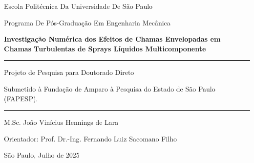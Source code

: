 \begin{titlepage}
    \centering
    \large
    {
    Escola Politécnica Da Universidade De São Paulo \par
    Programa De Pós-Graduação Em Engenharia Mecânica
    \par}

    \vspace*{5cm}
    
    {\bfseries\Large
    Investigação Numérica dos Efeitos de Chamas Envelopadas em Chamas Turbulentas de Sprays Líquidos Multicomponente\par}
    
    \vspace{2cm}

    \hrule
    \vspace{0.4cm}
    {
    Projeto de Pesquisa para Doutorado Direto\par
    Submetido à Fundação de Amparo à Pesquisa do Estado de São Paulo (FAPESP).
    }    
    \vspace{0.4cm}
    \hrule
    
    \vspace{3cm}
    {
    M.Sc. João Vinícius Hennings de Lara\par
    }
    
    \vspace{1.5cm}
    {
    Orientador: Prof. Dr.-Ing. Fernando Luiz Sacomano Filho
    }
    
    \vfill
    São Paulo, Julho de 2025

\end{titlepage}
